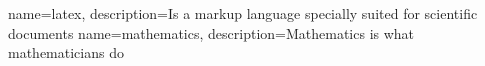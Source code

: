 
{
    name=latex,
    description={Is a markup language specially suited 
    for scientific documents}
}
{
    name=mathematics,
    description={Mathematics is what mathematicians do}
}



